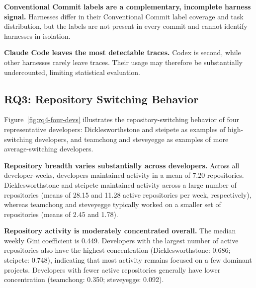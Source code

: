 \documentclass[smallextended]{svjour3}
\begin{document}
\textbf{Conventional Commit labels are a complementary, incomplete harness
signal.} Harnesses differ in their Conventional Commit label coverage and task
distribution, but the labels are not present in every commit and cannot identify
harnesses in isolation.

\textbf{Claude Code leaves the most detectable traces.} Codex is second, while
other harnesses rarely leave traces. Their usage may therefore be substantially
undercounted, limiting statistical evaluation.


\subsection{RQ3: Repository Switching Behavior}

Figure~\ref{fig:rq4-four-devs} illustrates the repository-switching behavior of four representative developers: Dicklesworthstone and steipete as examples of high-switching developers, and teamchong and steveyegge as examples of more average-switching developers.

\textbf{Repository breadth varies substantially across developers.} Across all
developer-weeks, developers maintained activity in a mean of 7.20 repositories.
Dicklesworthstone and steipete maintained activity across a large number of
repositories (means of 28.15 and 11.28 active repositories per week,
respectively), whereas teamchong and steveyegge typically worked on a smaller
set of repositories (means of 2.45 and 1.78).

\textbf{Repository activity is moderately concentrated overall.} The median
weekly Gini coefficient is 0.449. Developers with the largest number of active
repositories also have the highest concentration (Dicklesworthstone: 0.686;
steipete: 0.748), indicating that most activity remains focused on a few
dominant projects. Developers with fewer active repositories generally have
lower concentration (teamchong: 0.350; steveyegge: 0.092).
\end{document}
